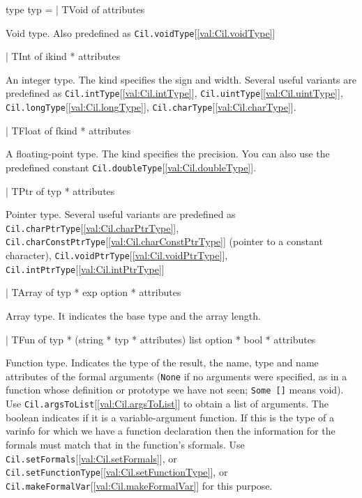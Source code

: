 \documentclass[11pt]{article}
\begin{document}
\label{type:Cil.typ}\begin{ocamldoccode}
type typ =
  | TVoid of attributes
\end{ocamldoccode}
\begin{ocamldoccomment}
Void type. Also predefined as {\tt{Cil.voidType}}[\ref{val:Cil.voidType}]
\end{ocamldoccomment}
\begin{ocamldoccode}
  | TInt of ikind * attributes
\end{ocamldoccode}
\begin{ocamldoccomment}
An integer type. The kind specifies the sign and width. Several 
 useful variants are predefined as {\tt{Cil.intType}}[\ref{val:Cil.intType}], {\tt{Cil.uintType}}[\ref{val:Cil.uintType}], 
 {\tt{Cil.longType}}[\ref{val:Cil.longType}], {\tt{Cil.charType}}[\ref{val:Cil.charType}].
\end{ocamldoccomment}
\begin{ocamldoccode}
  | TFloat of fkind * attributes
\end{ocamldoccode}
\begin{ocamldoccomment}
A floating-point type. The kind specifies the precision. You can 
 also use the predefined constant {\tt{Cil.doubleType}}[\ref{val:Cil.doubleType}].
\end{ocamldoccomment}
\begin{ocamldoccode}
  | TPtr of typ * attributes
\end{ocamldoccode}
\begin{ocamldoccomment}
Pointer type. Several useful variants are predefined as 
 {\tt{Cil.charPtrType}}[\ref{val:Cil.charPtrType}], {\tt{Cil.charConstPtrType}}[\ref{val:Cil.charConstPtrType}] (pointer to a 
 constant character), {\tt{Cil.voidPtrType}}[\ref{val:Cil.voidPtrType}], 
 {\tt{Cil.intPtrType}}[\ref{val:Cil.intPtrType}]
\end{ocamldoccomment}
\begin{ocamldoccode}
  | TArray of typ * exp option * attributes
\end{ocamldoccode}
\begin{ocamldoccomment}
Array type. It indicates the base type and the array length.
\end{ocamldoccomment}
\begin{ocamldoccode}
  | TFun of typ * (string * typ * attributes) list option * bool
   * attributes
\end{ocamldoccode}
\begin{ocamldoccomment}
Function type. Indicates the type of the result, the name, type 
 and name attributes of the formal arguments ({\tt{None}} if no 
 arguments were specified, as in a function whose definition or 
 prototype we have not seen; {\tt{Some []}} means void). Use 
 {\tt{Cil.argsToList}}[\ref{val:Cil.argsToList}] to obtain a list of arguments. The boolean 
 indicates if it is a variable-argument function. If this is the 
 type of a varinfo for which we have a function declaration then 
 the information for the formals must match that in the 
 function's sformals. Use {\tt{Cil.setFormals}}[\ref{val:Cil.setFormals}], or 
 {\tt{Cil.setFunctionType}}[\ref{val:Cil.setFunctionType}], or {\tt{Cil.makeFormalVar}}[\ref{val:Cil.makeFormalVar}] for this 
 purpose.
\end{ocamldoccomment}
\end{document}
